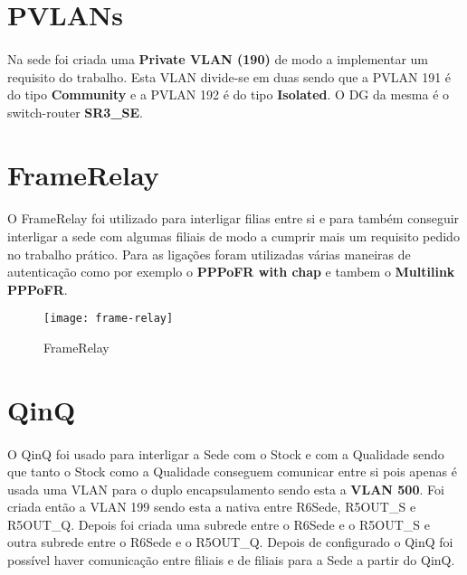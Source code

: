 \documentclass[11pt]{article}
\begin{document}
        \pagebreak
        
       	\large	
	\section{PVLANs}
	\normalsize
	\paragraph{}
        Na sede foi criada uma \textbf{Private VLAN (190)} de modo a implementar um requisito do trabalho. Esta VLAN divide-se em duas sendo que a PVLAN 191 é do tipo \textbf{Community} e a PVLAN 192 é do tipo \textbf{Isolated}. O DG da mesma é o switch-router \textbf{SR3\_SE}.


	\large	
	\section{FrameRelay}
	\normalsize
	\paragraph{}
        O FrameRelay foi utilizado para interligar filias entre si e para também conseguir interligar a sede com algumas filiais de modo a cumprir mais um requisito pedido no trabalho prático. Para as ligações foram utilizadas várias maneiras de autenticação como por exemplo o \textbf{PPPoFR with chap} e tambem o \textbf{Multilink PPPoFR}.

        \begin{figure}[h]
          \centering
          \texttt{[image: frame-relay]}
          \caption{FrameRelay}
          \label{fig.nav}
	\end{figure}


	\pagebreak

	\large	
	\section{QinQ}
	\normalsize
        \paragraph{}
        O QinQ foi usado para interligar a Sede com o Stock e com a Qualidade sendo que tanto o Stock como a Qualidade conseguem comunicar entre si pois apenas é usada uma VLAN para o duplo encapsulamento sendo esta a \textbf{VLAN 500}. Foi criada então a VLAN 199 sendo esta a nativa entre R6Sede, R5OUT\_S e R5OUT\_Q. Depois foi criada uma subrede entre o R6Sede e o R5OUT\_S e outra subrede entre o R6Sede e o R5OUT\_Q. Depois de configurado o QinQ foi possível haver comunicação entre filiais e de filiais para a Sede a partir do QinQ.
\end{document}

